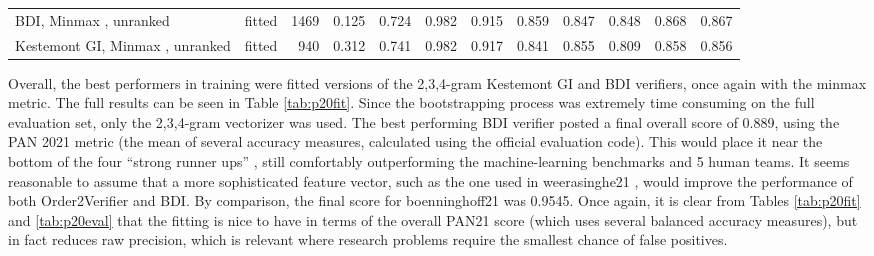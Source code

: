 \documentclass[
    hf
]{ceurart}
\begin{document}
\begin{table}
\begin{adjustbox}{max width=\textwidth}
\begin{tabular}{llrrrrrrrrrr}
            \\
            BDI, Minmax , unranked                    & fitted           & 1469      & 0.125   & 0.724  & 0.982          & 0.915          & 0.859          & 0.847          & 0.848          & 0.868          & 0.867          \\
            Kestemont GI, Minmax , unranked           & fitted           & 940       & 0.312   & 0.741  & 0.982          & 0.917          & 0.841          & 0.855          & 0.809          & 0.858          & 0.856          \\
            \bottomrule
        \end{tabular}
    \end{adjustbox}
\end{table}

Overall, the best performers in training were fitted versions of the 2,3,4-gram Kestemont GI and BDI
verifiers, once again with the minmax metric. The full results can be seen in Table
\ref{tab:p20fit}. Since the bootstrapping process was extremely time consuming on the full
evaluation set, only the 2,3,4-gram vectorizer was used. The best performing BDI verifier posted a
final overall score of 0.889, using the PAN 2021 metric (the mean of several accuracy measures,
calculated using the official evaluation code). This would place it near the bottom of the four
``strong runner ups'' \cite[7]{kestemont2021overview}, still comfortably outperforming the
machine-learning benchmarks and 5 human teams. It seems reasonable to assume that a more
sophisticated feature vector, such as the one used in weerasinghe21 \cite{weerasinghe2021feature},
would improve the performance of both Order2Verifier and BDI. By comparison, the final score for
boenninghoff21 was 0.9545. Once again, it is clear from Tables \ref{tab:p20fit} and
\ref{tab:p20eval} that the fitting is nice to have in terms of the overall PAN21 score (which uses
several balanced accuracy measures), but in fact reduces raw precision, which is relevant where
research problems require the smallest chance of false positives.
\end{document}
